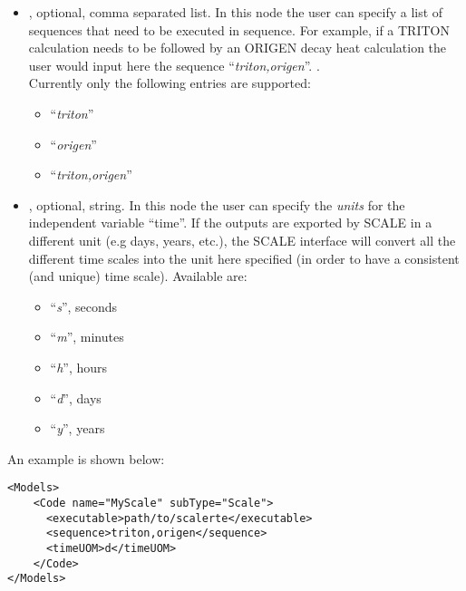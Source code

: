 \begin{itemize}
  \item {}, optional, comma separated list. In this node the user can specify a list of sequences that need to be
  executed in sequence. For example, if a TRITON calculation needs to be followed by an ORIGEN decay heat calculation the user
  would input here the sequence ``\textit{triton,origen}''. .
  \\\nb Currently only the following entries are supported:
    \begin{itemize}
     \item  ``\textit{triton}''
     \item  ``\textit{origen}''
     \item  ``\textit{triton,origen}''
    \end{itemize}
  \item {}, optional, string. In this node the user can specify  the \textit{units} for the independent variable ``time''.
   If the outputs are exported by SCALE in a different unit (e.g days, years, etc.), the SCALE interface will convert all the different
   time scales into the unit here specified (in order to have a consistent  (and unique) time scale). Available are:
    \begin{itemize}
     \item ``\textit{s}'', seconds
     \item ``\textit{m}'', minutes
     \item ``\textit{h}'', hours
     \item ``\textit{d}'', days
     \item ``\textit{y}'', years
    \end{itemize}
\end{itemize}

An example  is shown  below:
\begin{lstlisting}[style=XML]
<Models>
    <Code name="MyScale" subType="Scale">
      <executable>path/to/scalerte</executable>
      <sequence>triton,origen</sequence>
      <timeUOM>d</timeUOM>
    </Code>
</Models>
\end{lstlisting}

